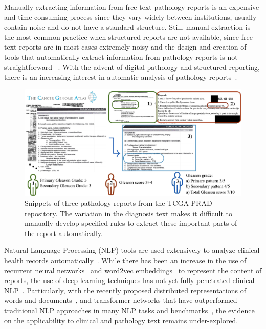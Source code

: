 \documentclass[runningheads]{llncs}
\begin{document}
Manually extracting information from free-text pathology reports is an expensive and time-consuming process since they vary widely between institutions, usually contain noise and do not have a standard structure.
Still, manual extraction is the most common practice when structured reports are not available, since free-text reports are in most cases extremely noisy and the design and creation of tools that automatically extract information from pathology reports is not straightforward ~\cite{OAK2020,CHG2019,del2017convolutional}. 
With the advent of digital pathology and structured reporting, there is an increasing interest in automatic analysis of pathology reports~\cite{BNF2019,YBS2017,QYF2017,GYQ2018,XCS2018}.
%
\begin{figure}
\label{fig:reports}
\includegraphics[width=\textwidth]{examples_reports.eps}
\caption{Snippets of three pathology reports from the TCGA-PRAD repository. The variation in the diagnosis text makes it difficult to manually develop specified rules to extract these important parts of the report automatically.} 
\end{figure}
%

Natural Language Processing (NLP) tools are used extensively to analyze clinical health records automatically~\cite{YBS2017,OMS2020,GYQ2018}.  While there has been an increase in the use of recurrent neural networks~\cite{GYQ2018} and word2vec embeddings~\cite{JOA2017a} to represent the content of reports, the use of deep learning techniques has not yet fully penetrated clinical NLP~\cite{WRD2020}. Particularly, with the recently proposed distributed representations of words and documents~\cite{le2014distributed}, and transformer networks that have outperformed traditional NLP approaches in many NLP tasks and benchmarks~\cite{VSP2017}, the evidence on the applicability to clinical and pathology text remains under-explored.
\end{document}
